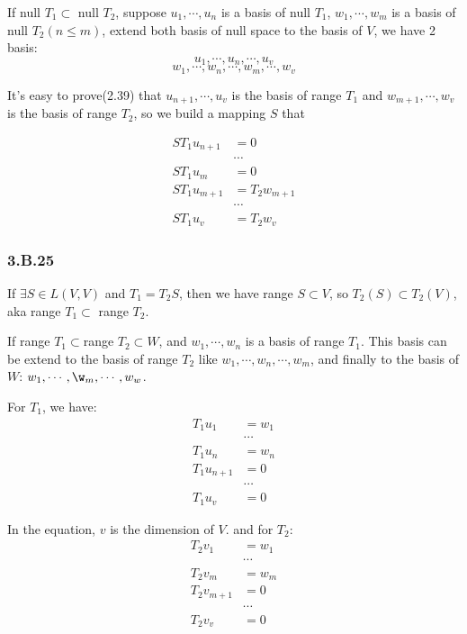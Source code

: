If null $T_{1} \subset$ null $T_{2}$, suppose $u_{1},\cdots,u_{n}$ is a basis of null $T_{1}$,  $w_{1}, \cdots,w_{m}$ is a basis of null $T_{2} (n\leq m)$, extend both basis of null space to the basis of $V$, we have 2 basis:
\[u_{1},\cdots,u_{n},\cdots, u_{v}\]
\[w_{1},\cdots,w_{n},\cdots,w_{m}, \cdots, w_{v}\]

It's easy to prove(2.39) that $u_{n+1},\cdots,u_{v}$ is the basis of range $T_{1}$ and $w_{m+1},\cdots,w_{v}$ is the basis of range $T_{2}$, so we build a mapping $S$ that

\begin{equation*}
    \begin{split}
    ST_{1}u_{n+1} &= 0 \\
    &\cdots \\
    ST_{1}u_{m} &= 0 \\
    ST_{1}u_{m+1} &= T_{2}w_{m+1} \\
    &\cdots \\
    ST_{1}u_{v} &= T_{2}w_{v}
\end{split}
\end{equation*}

\subsubsection*{3.B.25}

If $\exists S\in L(V, V)$ and $T_{1} = T_{2}S$, then we have range $S \subset V$, so $T_{2}(S) \subset T_{2}(V)$, aka range $T_{1} \subset$ range $T_{2}$.

If range $T_{1}\subset $range $T_{2} \subset W$, and $w_{1}, \cdots, w_{n}$ is a basis of range $T_{1}$. 
This basis can be extend to the basis of range $T_{2}$ like $w_{1}, \cdots, w_{n}, \cdots, w_{m}$, and finally to the basis of $W$: $w_{1},\cdots,\w_{m},\cdots, w_{w}$.

For $T_{1}$, we have:
\begin{equation*}
    \begin{split}
T_{1}u_{1} &= w_{1} \\
&\cdots \\
T_{1}u_{n} &= w_{n} \\
T_{1}u_{n+1} &= 0 \\
&\cdots \\
T_{1}u_{v} &= 0 
\end{split}
\end{equation*}

In the equation, $v$ is the dimension of $V$. and for $T_{2}$:
\begin{equation*}
    \begin{split}
T_{2}v_{1} &= w_{1} \\
&\cdots \\
T_{2}v_{m} &= w_{m} \\
T_{2}v_{m+1} &= 0 \\
&\cdots \\
T_{2}v_{v} &= 0 
\end{split}
\end{equation*}

